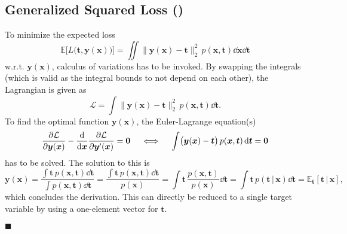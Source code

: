 \documentclass[11pt, a4paper]{scrartcl}
\newcommand{\E}{\mathbb{E}}
\renewcommand{\vec}[1]{\bm{#1}}
\newcommand{\given}{\,\vert\,}
\newcommand{\eot}{\hfill\(\blacksquare\)}
\newcommand{\diffstar}{\texorpdfstring{\raisebox{-1pt}{\resizebox{!}{8pt}{\(\star\)}}}{*}}
\newcommand{\onestar}  {(\diffstar)}
\begin{document}
		\subsection{Generalized Squared Loss  \onestar}
			To minimize the expected loss
			\begin{equation}
				\E\big[ L\big( \vec{t}, \vec{y}(\vec{x}) \big) \big] = \iint\! \big\lVert \vec{y}(\vec{x}) - \vec{t} \big\rVert_2^2 \, p(\vec{x}, \vec{t}) \dd{\vec{x}} \dd{\vec{t}}
			\end{equation}
			w.r.t. \( \vec{y}(\vec{x}) \), calculus of variations has to be invoked. By swapping the integrals (which is valid as the integral bounds to not depend on each other), the Lagrangian is given as
			\begin{equation}
				\mathcal{L} = \int\! \big\lVert \vec{y}(\vec{x}) - \vec{t} \big\rVert_2^2 \, p(\vec{x}, \vec{t}) \dd{\vec{t}}.
			\end{equation}
			To find the optimal function \( \vec{y}(\vec{x}) \), the Euler-Lagrange equation(s)
			\begin{equation}
				\pdv{\mathcal{L}}{\vec{y}(\vec{x})} - \dv{\vec{x}} \pdv{\mathcal{L}}{\vec{y}'(\vec{x})} = \vec{0}
				\quad\iff\quad
				\int\! \big( \vec{y}(\vec{x}) - \vec{t} \big) \, p(\vec{x}, \vec{t}) \dd{\vec{t}} = \vec{0}
			\end{equation}
			has to be solved. The solution to this is
			\begin{equation}
				\vec{y}(\vec{x})
					= \frac{\int\! \vec{t} \, p(\vec{x}, \vec{t}) \dd{\vec{t}}}{\int\! p(\vec{x}, \vec{t}) \dd{\vec{t}}}
					= \frac{\int\! \vec{t} \, p(\vec{x}, \vec{t}) \dd{\vec{t}}}{p(\vec{x})}
					= \int\! \vec{t} \, \frac{p(\vec{x}, \vec{t})}{p(\vec{x})} \dd{\vec{t}}
					= \int\! \vec{t} \, p(\vec{t} \given \vec{x}) \dd{\vec{t}}
					= \E_{\vec{t}}[\vec{t} \given \vec{x}],
			\end{equation}
			which concludes the derivation. This can directly be reduced to a single target variable by using a one-element vector for \(\vec{t}\).

			\eot
\end{document}
